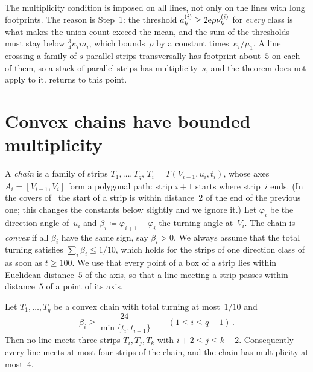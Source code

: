 \documentclass[11pt,letterpaper]{article}
\begin{document}
\begin{remark}
\label{rem:nolowclass}
The multiplicity condition is imposed on all lines, not only on the lines with long footprints. The reason is Step~1: the threshold $a^{(i)}_k\ge2\mathrm{e}\rho\nu^{(i)}_k$ for \emph{every} class is what makes the union count exceed the mean, and the sum of the thresholds must stay below $\tfrac34\kappa_im_i$, which bounds~$\rho$ by a constant times~$\kappa_i/\mu_1$. A line crossing a family of $s$ parallel strips transversally has footprint about~$5$ on each of them, so a stack of parallel strips has multiplicity~$s$, and the theorem does not apply to it.  returns to this point.
\end{remark}

\section{Convex chains have bounded multiplicity}
\label{sec:convex}

A \emph{chain} is a family of strips $T_1,\dots,T_q$, $T_i=T(V_{i-1},u_i,t_i)$, whose axes $A_i=[V_{i-1},V_i]$ form a polygonal path: strip $i+1$ starts where strip~$i$ ends. (In the covers of~\cite{SC26} the start of a strip is within distance~$2$ of the end of the previous one; this changes the constants below slightly and we ignore it.) Let $\varphi_i$ be the direction angle of~$u_i$ and $\beta_i\coloneqq\varphi_{i+1}-\varphi_i$ the turning angle at~$V_i$. The chain is \emph{convex} if all $\beta_i$ have the same sign, say $\beta_i>0$. We always assume that the total turning satisfies $\sum_i\beta_i\le1/10$, which holds for the strips of one direction class of~\cite{SC26} as soon as $t\ge100$. We use that every point of a box of a strip lies within Euclidean distance~$5$ of the axis, so that a line meeting a strip passes within distance~$5$ of a point of its axis.

\begin{lemma}
\label{lem:convex}
Let $T_1,\dots,T_q$ be a convex chain with total turning at most~$1/10$ and
\begin{equation}
\label{eq:bend}
  \beta_i\ge\frac{24}{\min\{t_i,t_{i+1}\}}\qquad(1\le i\le q-1)\,.
\end{equation}
Then no line meets three strips $T_i,T_j,T_k$ with $i+2\le j\le k-2$. Consequently every line meets at most four strips of the chain, and the chain has multiplicity at most~$4$.
\end{lemma}
\end{document}
